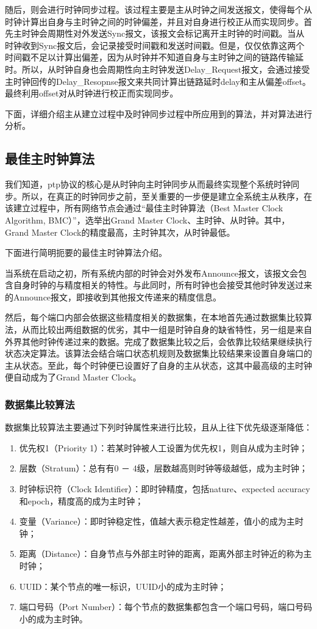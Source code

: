 随后，则会进行时钟同步过程。该过程主要是主从时钟之间发送报文，使得每个从时钟计算出自身与主时钟之间的时钟偏差，并且对自身进行校正从而实现同步。首先主时钟会周期性对外发送Sync报文，该报文会标记离开主时钟的时间戳。当从时钟收到Sync报文后，会记录接受时间戳和发送时间戳。但是，仅仅依靠这两个时间戳不足以计算出偏差，因为从时钟并不知道自身与主时钟之间的链路传输延时。所以，从时钟自身也会周期性向主时钟发送Delay\_Request报文，会通过接受主时钟回传的Delay\_Resopnse报文来共同计算出链路延时delay和主从偏差offset。最终利用offset对从时钟进行校正而实现同步。

下面，详细介绍主从建立过程中及时钟同步过程中所应用到的算法，并对算法进行分析。

\subsection{最佳主时钟算法}
\label{sec:1588_theory_bmc}
我们知道，ptp协议的核心是从时钟向主时钟同步从而最终实现整个系统时钟同步。所以，在真正的时钟同步之前，至关重要的一步便是建立全系统主从秩序，在该建立过程中，所有网络节点会通过“最佳主时钟算法（Best Master Clock Algorithm, BMC）”，选举出Grand Master Clock、主时钟、从时钟。其中，Grand Master Clock的精度最高，主时钟其次，从时钟最低。

下面进行简明扼要的最佳主时钟算法介绍。

当系统在启动之初，所有系统内部的时钟会对外发布Announce报文，该报文会包含自身时钟的与精度相关的特性。与此同时，所有时钟也会接受其他时钟发送过来的Announce报文，即接收到其他报文传递来的精度信息。

然后，每个端口内部会依据这些精度相关的数据集，在本地首先通过数据集比较算法，从而比较出两组数据的优劣，其中一组是时钟自身的缺省特性，另一组是来自外界其他时钟传递过来的数据。完成了数据集比较之后，会依靠比较结果继续执行状态决定算法。该算法会结合端口状态机规则及数据集比较结果来设置自身端口的主从状态。至此，每个时钟便已设置好了自身的主从状态，这其中最高级的主时钟便自动成为了Grand Master Clock。

\subsubsection{数据集比较算法}
数据集比较算法主要通过下列时钟属性来进行比较，且从上往下优先级逐渐降低：
\begin{enumerate}[noitemsep,topsep=0pt,parsep=0pt,partopsep=0pt]
	\item 优先权1（Priority 1）：若某时钟被人工设置为优先权1，则自从成为主时钟；
	\item 层数（Stratum）：总有有0 － 4级，层数越高则时钟等级越低，成为主时钟；
	\item 时钟标识符（Clock Identifier）：即时钟精度，包括nature、expected accuracy和epoch，精度高的成为主时钟；
	\item 变量（Variance）：即时钟稳定性，值越大表示稳定性越差，值小的成为主时钟；
	\item 距离（Distance）：自身节点与外部主时钟的距离，距离外部主时钟近的称为主时钟；
	\item UUID：某个节点的唯一标识，UUID小的成为主时钟；
	\item 端口号码（Port Number）：每个节点的数据集都包含一个端口号码，端口号码小的成为主时钟。
\end{enumerate}

